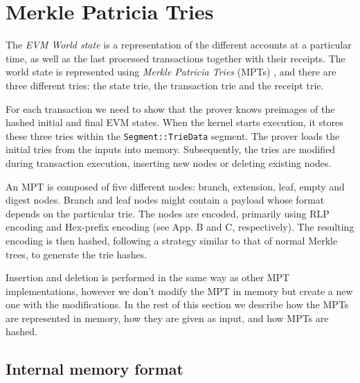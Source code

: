 \section{Merkle Patricia Tries}
\label{tries}
The \emph{EVM World state} is a representation of the different accounts at a particular time, as well as the last processed transactions together with their receipts. The world state is represented using \emph{Merkle Patricia Tries} (MPTs) \cite[App.~D]{yellowpaper}, and there are three different tries: the state trie, the transaction trie and the receipt trie.

For each transaction we need to show that the prover knows preimages of the hashed initial and final EVM states.  When the kernel starts execution, it stores these three tries within the {\tt Segment::TrieData} segment. The prover loads the initial tries from the inputs into memory. Subsequently, the tries are modified during transaction execution, inserting new nodes or deleting existing nodes. 

An MPT is composed of five different nodes: branch, extension, leaf, empty and digest nodes. Branch and leaf nodes might contain a payload whose format depends on the particular trie. The nodes are encoded, primarily using RLP encoding and Hex-prefix encoding (see \cite{yellowpaper} App. B and C, respectively). The resulting encoding is then hashed, following a strategy similar to that of normal Merkle trees, to generate the trie hashes.

Insertion and deletion is performed in the same way as other MPT implementations, however we don't modify the MPT in memory but create a new one with the modifications. In the rest of this section we describe how the MPTs are represented in memory, how they are given as input, and how MPTs are hashed.

\subsection{Internal memory format}

